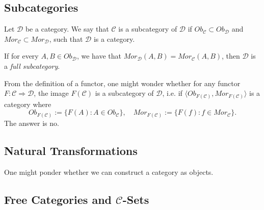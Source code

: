\subsection{Subcategories}

\begin{definition}[Subcategory]
  Let $\mathcal D$ be a category. We say that $\mathcal C$
  is a subcategory of $\mathcal D$ if $Ob_\mathcal C \subset Ob_\mathcal D$ and
  $Mor_\mathcal C \subset Mor_\mathcal D$, such that $\mathcal D$ is a category.

  If for every $A, B \in Ob_\mathcal D$, we have that $Mor_\mathcal D (A,B) = Mor_\mathcal C(A,B)$,
  then $\mathcal D$ is a \textit{full subcategory}.
\end{definition}

From the definition of a functor, one might wonder whether for any
functor $F:\mathcal C \Rightarrow \mathcal D$,
the image $F(\mathcal C)$ is a subcategory of $\mathcal D$, i.e.
if $\langle Ob_{F(\mathcal C)}, Mor_{F(\mathcal C)} \rangle$ is a category where
\begin{displaymath}
  Ob_{F(\mathcal C)}:= \{F(A) : A \in Ob_\mathcal C\}, \quad
  Mor_{F(\mathcal C)}:= \{F(f) : f \in Mor_\mathcal C\}.
\end{displaymath}
The answer is no.

\subsection{Natural Transformations}

One might ponder whether we can construct a category
as objects. 

\subsection{Free Categories and $\mathcal C$-Sets}


